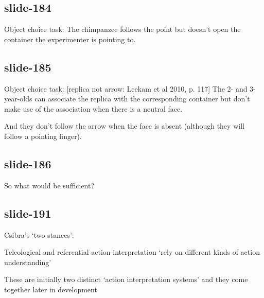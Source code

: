 \documentclass[12pt,\papersize]{extarticle}
\begin{document}
\subsection{slide-184}
Object choice task: The chimpanzee follows the point but doesn’t open the container
the experimenter is pointing to.

\subsection{slide-185}
Object choice task: [replica not arrow: Leekam et al 2010, p. 117] The 2-
and 3-year-olds can associate the replica with the corresponding container
but don’t make use of the association when there is a neutral face.

And they don’t follow the arrow when the face is absent (although they will
follow a pointing finger).

\subsection{slide-186}
So what would be sufficient?

\subsection{slide-191}
Csibra’s ‘two stances’:

Teleological and referential action interpretation ‘rely on different kinds of action understanding’

These are initially two distinct ‘action interpretation systems’ and they come together later in development

\citep[p.~456]{Csibra:2003kp}
 








\end{document}
